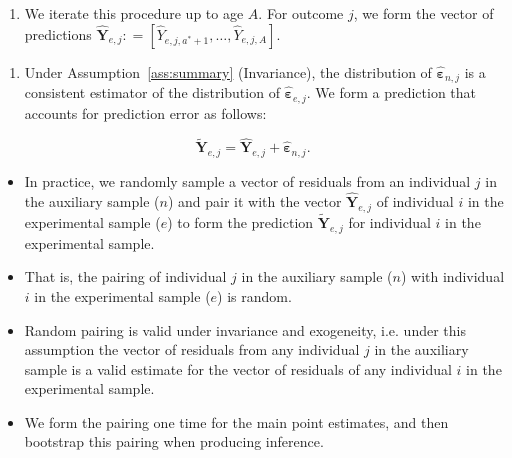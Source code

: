 \documentclass[static]{JJH-Beamer}
\begin{document}
\begin{frame}

\begin{enumerate}[4.]
\item We iterate this procedure up to age $A$. For outcome $j$, we form the vector of predictions $\hat{\bm{Y}}_{e,j} : = \left[ \hat{Y}_{e,j,a^*+1}, \ldots,  \hat{Y}_{e,j,A} \right]$.
\end{enumerate}

\end{frame}

\begin{frame}

\begin{enumerate}[5.]
\item Under Assumption~\ref{ass:summary} (Invariance), the distribution of $\hat{\bm{\varepsilon}}_{n,j}$ is a consistent estimator of the distribution of $\hat{\bm{\varepsilon}}_{e,j}$. We form a prediction that accounts for prediction error as follows:
\end{enumerate}

\begin{equation}
\tilde{\bm{Y}}_{e,j} = \hat{\bm{Y}}_{e,j} + \hat{\bm{\varepsilon}}_{n,j}.
\end{equation}

\end{frame}

\begin{frame}

\begin{itemize}
\item In practice, we randomly sample a vector of residuals from an individual $j$ in the auxiliary sample ($n$) and pair it with the vector $\hat{\bm{Y}}_{e,j}$ of individual $i$ in the experimental sample ($e$) to form the prediction $\tilde{\bm{Y}}_{e,j}$ for individual $i$ in the experimental sample.
\item That is, the pairing of individual $j$ in the auxiliary sample ($n$) with individual $i$ in the experimental sample ($e$) is random.
\item Random pairing is valid under invariance and exogeneity, i.e. under this assumption the vector of residuals from any individual $j$ in the auxiliary sample is a valid estimate for the vector of residuals of any individual $i$ in the experimental sample.
\item We form the pairing one time for the main point estimates, and then bootstrap this pairing when producing inference.
\end{itemize}

\end{frame}
\end{document}
